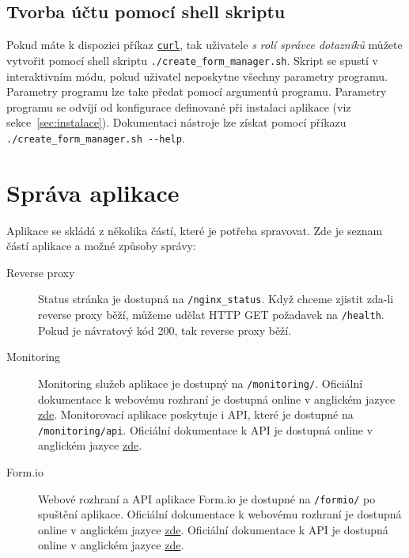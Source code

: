 \subsection{Tvorba účtu pomocí shell skriptu}\label{subsec:tvorba-uctu-pomoci-shell-skriptu}

Pokud máte k dispozici příkaz \href{https://curl.se/}{\texttt{curl}}, tak uživatele \textit{s rolí správce dotazníků} můžete vytvořit pomocí shell skriptu \texttt{./create\_form\_manager.sh}.
Skript se spustí v interaktivním módu, pokud uživatel neposkytne všechny parametry programu.
Parametry programu lze take předat pomocí argumentů programu.
Parametry programu se odvíjí od konfigurace definované při instalaci aplikace (viz sekce~\ref{sec:instalace}).
Dokumentaci nástroje lze získat pomocí příkazu \verb|./create_form_manager.sh --help|.


\section{Správa aplikace}\label{sec:sprava-aplikace}

Aplikace se skládá z několika částí, které je potřeba spravovat.
Zde je seznam částí aplikace a možné způsoby správy:

\begin{description}
    \item[Reverse proxy] Status stránka je dostupná na \texttt{/nginx\_status}.
    Když chceme zjistit zda-li reverse proxy běží, můžeme udělat HTTP GET požadavek na \texttt{/health}.
    Pokud je návratový kód 200, tak reverse proxy běží.
    \item[Monitoring] Monitoring služeb aplikace je dostupný na \texttt{/monitoring/}.
    Oficiální dokumentace k webovému rozhraní je dostupná online v anglickém jazyce \href{https://github.com/google/cadvisor/blob/master/docs/web.md}{zde}.
    Monitorovací aplikace poskytuje i API, které je dostupné na \texttt{/monitoring/api}.
    Oficiální dokumentace k API je dostupná online v anglickém jazyce \href{https://github.com/google/cadvisor/blob/master/docs/api.md}{zde}.
    \item[Form.io] Webové rozhraní a API aplikace Form.io je dostupné na \texttt{/formio/} po spuštění aplikace.
    Oficiální dokumentace k webovému rozhraní je dostupná online v anglickém jazyce \href{https://help.form.io/}{zde}.
    Oficiální dokumentace k API je dostupná online v anglickém jazyce \href{https://apidocs.form.io/}{zde}.
\end{description}

